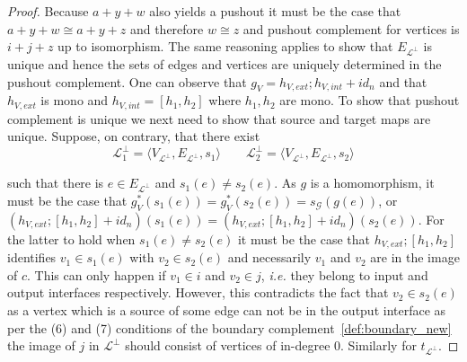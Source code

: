 \begin{proof}
    Because $a + y + w$ also yields a pushout it must be the case that $a + y + w \cong a + y + z$ and therefore $w \cong z$ and pushout complement for vertices is $i + j + z$ up to isomorphism.
    The same reasoning applies to show that $E_{\mathcal{L}^{\bot}}$ is unique and hence the sets of edges and vertices are uniquely determined in the pushout complement.
    One can observe that $g_{V} = h_{V,ext};h_{V,int} + id_{n}$ and that $h_{V,ext}$ is mono and $h_{V,int} = [h_1,h_2]$ where $h_1,h_2$ are mono.
    To show that pushout complement is unique we next need to show that source and target maps are unique.
    Suppose, on contrary, that there exist
    \[
    \mathcal{L}_{1}^{\bot} = \langle V_{\mathcal{L}^{\bot}}, E_{\mathcal{L}^{\bot}}, s_{1} \rangle \qquad \mathcal{L}_{2}^{\bot} = \langle V_{\mathcal{L}^{\bot}}, E_{\mathcal{L}^{\bot}}, s_{2} \rangle
    \]

    such that there is $e \in E_{\mathcal{L}^{\bot}}$ and $s_{1}(e) \not = s_{2}(e)$.
    As $g$ is a homomorphism, it must be the case that $g^{*}_{V}(s_{1}(e)) = g^{*}_{V}(s_{2}(e)) = s_{\mathcal{G}}(g(e))$, or
    $(h_{V,ext};[h_{1},h_{2}] + id_{n})(s_{1}(e)) = (h_{V,ext};[h_{1},h_{2}] + id_{n})(s_{2}(e))$.
    For the latter to hold when $s_{1}(e) \not = s_{2}(e)$ it must be the case that $h_{V,ext};[h_{1},h_{2}]$ identifies $v_{1} \in s_{1}(e)$ with $v_{2} \in s_{2}(e)$ and necessarily $v_{1}$ and $v_{2}$ are in the image of $c$.
    This can only happen if $v_1 \in i$ and $v_2 \in j$, \textit{i.e.} they belong to input and output interfaces respectively.
    However, this contradicts the fact that $v_2 \in s_2(e)$ as a vertex which is a source of some edge can not be in the output interface as per the (6) and (7) conditions of the boundary complement~\ref{def:boundary_new} the image of $j$ in $\mathcal{L}^{\bot}$ should consist of vertices of in-degree 0.
    Similarly for $t_{\mathcal{L}^{\bot}}$.

    

\end{proof}
